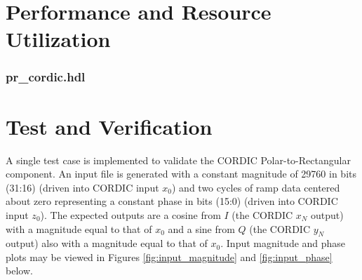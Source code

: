 \documentclass{article}
\def\comp{pr\_cordic}
\edef\ecomp{pr_cordic}
\begin{document}
\section*{Performance and Resource Utilization}
\subsubsection*{\comp.hdl}

\section*{Test and Verification}
\begin{flushleft}
	A single test case is implemented to validate the CORDIC Polar-to-Rectangular component. An input file is generated with a constant magnitude of 29760 in bits (31:16) (driven into CORDIC input $x_0$) and two cycles of ramp data centered about zero representing a constant phase in bits (15:0) (driven into CORDIC input $z_0$). The expected outputs are a cosine from $I$ (the CORDIC $x_N$ output) with a magnitude equal to that of $x_0$ and a sine from $Q$ (the CORDIC $y_N$ output) also with a magnitude equal to that of $x_0$. Input magnitude and phase plots may be viewed in Figures \ref{fig:input_magnitude} and \ref{fig:input_phase} below.
\end{flushleft}
\end{document}
